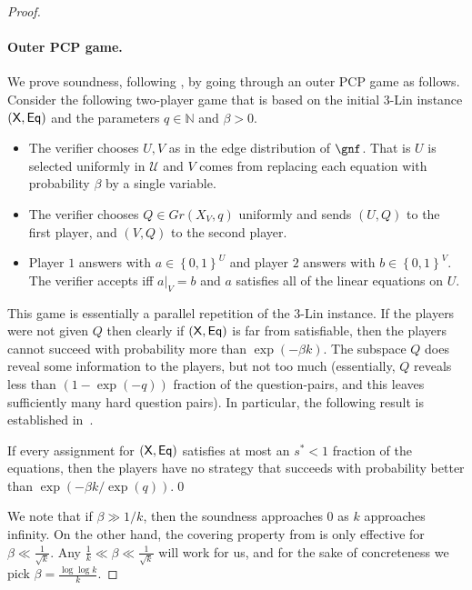 \documentclass{toc}
\newcommand\set[1]{{\left\{ #1 \right\}}}
\newcommand\power[1]{\set{0,1}^{#1}}
\def\U{\mathcal{U}}
\begin{document}
\begin{proof}
\paragraph{Outer PCP game.}
We prove soundness, following \cite{KMS}, by going through an outer PCP game as follows. Consider
the following two-player game that is based on the initial 3-Lin instance $({\sf X,Eq})$
and the parameters $q\in\mathbb{N}$ and $\beta>0$.%
\begin{itemize}
  \item The verifier chooses $U,V$ as in the edge distribution of
    $\gnf$. That is  $U$ is selected uniformly in $\U$ and $V$ comes from replacing each equation with probability $\beta$ by a single variable.
  \item The verifier chooses $Q\in Gr(X_V,q)$ uniformly and sends $(U,Q)$ to the first player, and $(V,Q)$ to the second player.
  \item Player $1$ answers with $a\in\power U$ and player $2$ answers with $b\in \power V$. The verifier accepts iff $a|_V=b$ and $a$ satisfies all of the linear equations on $U$.
\end{itemize}
This game is essentially a parallel repetition of the 3-Lin instance. If the players were not given $Q$ then clearly if $\sf (X,Eq)$ is far from satisfiable, then the players cannot succeed with probability more than
$\exp(-\beta k)$.
%
The subspace $Q$ does reveal some information to the players, but not too much (essentially, $Q$ reveals less than $(1-\exp(-q))$ fraction of the question-pairs, and this leaves sufficiently many hard question pairs).
In particular, the following result is established in~\cite[Section 3.4]{KMS}. %
%
\begin{lemma}\label{lem:outer}  %
If every assignment for $\sf (X,Eq)$ satisfies at most an $s^*<1$ fraction of the equations, then the players have no strategy that succeeds with probability better than
$\exp(-\beta k/\exp(q))$.\qed %
%
\end{lemma}
We note that if $\beta\gg 1/k$, then the soundness approaches $0$ as $k$ approaches infinity.
On the other hand, the covering property from  is only effective for $\beta\ll \frac{1}{\sqrt{k}}$.
Any $\frac{1}{k}\ll \beta\ll \frac{1}{\sqrt{k}}$ will work for us, and for the sake of concreteness
we pick $\beta = \frac{\log\log k}{k}$. %


\end{proof}
\end{document}

